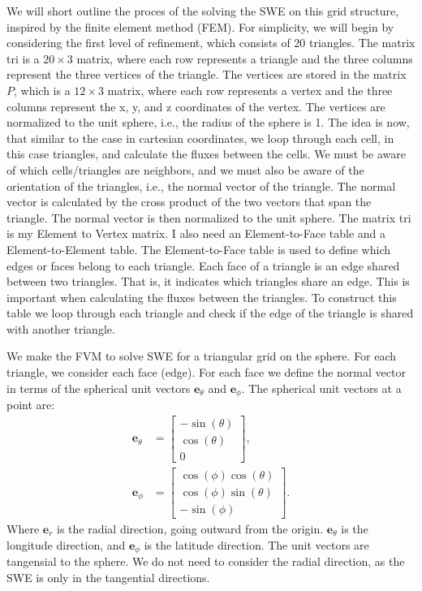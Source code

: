 We will short outline the proces of the solving the SWE on this grid structure, inspired by the finite element method (FEM).
For simplicity, we will begin by considering the first level of refinement, which consists of 20 triangles.
The matrix tri is a $20 \times 3$ matrix, where each row represents a triangle and the three columns represent the three vertices of the triangle.
The vertices are stored in the matrix $P$, which is a $12 \times 3$ matrix, where each row represents a vertex and the three columns represent the x, y, and z coordinates of the vertex.
The vertices are normalized to the unit sphere, i.e., the radius of the sphere is 1.
The idea is now, that similar to the case in cartesian coordinates, we loop through each cell, in this case triangles, and calculate the fluxes between the cells.
We must be aware of which cells/triangles are neighbors, and we must also be aware of the orientation of the triangles, i.e., the normal vector of the triangle.
The normal vector is calculated by the cross product of the two vectors that span the triangle.
The normal vector is then normalized to the unit sphere.
The matrix tri is my Element to Vertex matrix. 
I also need an Element-to-Face table and a Element-to-Element table.
The Element-to-Face table is used to define which edges or faces belong to each triangle.
Each face of a triangle is an edge shared between two triangles.
That is, it indicates which triangles share an edge. This is important when calculating the fluxes between the triangles.
To construct this table we loop through each triangle and check if the edge of the triangle is shared with another triangle.


We make the FVM to solve SWE for a triangular grid on the sphere.
For each triangle, we consider each face (edge).
For each face we define the normal vector in terms of the spherical unit vectors $\mathbf{e}_\theta$ and $\mathbf{e}_\phi$.
The spherical unit vectors at a point are:
\begin{align*}
    \mathbf{e}_\theta &= \begin{bmatrix}
        - \sin(\theta) \\
        \cos(\theta) \\
        0
    \end{bmatrix}, \\
    \mathbf{e}_\phi &= \begin{bmatrix}
        \cos(\phi) \cos(\theta) \\
        \cos(\phi) \sin(\theta) \\
        -\sin(\phi)
    \end{bmatrix}.
\end{align*}
Where $\mathbf{e}_r$ is the radial direction, going outward from the origin.
$\mathbf{e}_\theta$ is the longitude direction, and $\mathbf{e}_\phi$ is the latitude direction.
The unit vectors are tangensial to the sphere.
We do not need to consider the radial direction, as the SWE is only in the tangential directions.

